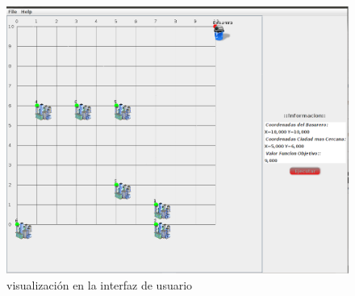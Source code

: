 \documentclass[10pt]{article}
\begin{document}
\begin{figure}[ht]
\begin{minipage}[b]{1\linewidth}
 \centering
 \includegraphics[scale=0.3]{basurero.png}
 \caption{visualizaci\'on en la interfaz de usuario}
 \label{fig:heu3}
 \end{minipage}
\end{figure}



\newpage
\end{document}
